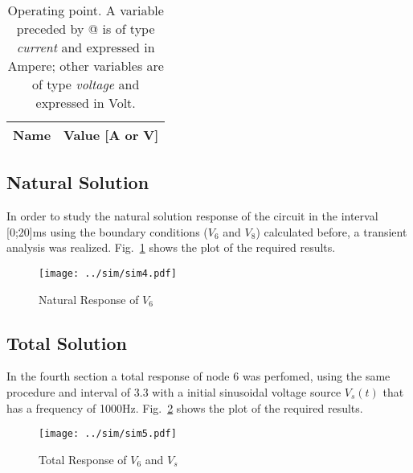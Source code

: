 \pagebreak
\begin{table}[!ht]
  \centering
  \begin{tabular}{|l|r|}
    \hline    
    {\bf Name} & {\bf Value [A or V]} \\ \hline
    
  \end{tabular}
  \caption{Operating point. A variable preceded by @ is of type {\em current}
    and expressed in Ampere; other variables are of type {\it voltage} and expressed in
    Volt.}
  \label{tab:op2}
\end{table}


\subsection{Natural Solution}
In order to study the natural solution response of the circuit in the interval [0;20]ms using the boundary conditions ($V_{6}$ and $V_{8}$) calculated before, a transient analysis was realized. 
Fig.~\ref{fig:sim3} shows the plot of the required results.
\newline
\newline
\newline

\begin{figure}[H] \centering
\texttt{[image: ../sim/sim4.pdf]}
\caption{Natural Response of $V_{6}$} 
\label{fig:sim3}
\end{figure}


\pagebreak

\subsection{Total Solution}

In the fourth section a total response of node 6 was perfomed, using the same procedure and interval of 3.3 with a initial sinusoidal voltage source $V_{s}(t)$ that has a frequency of 1000Hz. 
Fig.~\ref{fig:sim4} shows the plot of the required results.

\begin{figure}[H] \centering
\texttt{[image: ../sim/sim5.pdf]}
\caption{Total Response of $V_{6}$ and $V_{s}$}
\label{fig:sim4}
\end{figure}




